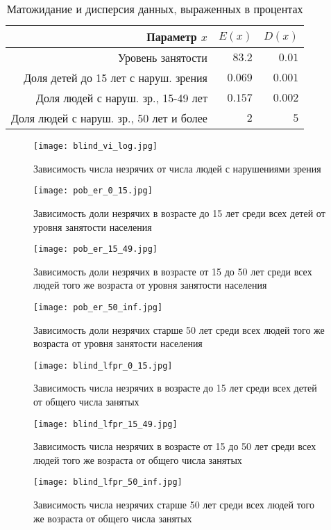 \documentclass[main.tex]{subfiles}
\begin{document}
	
\begin{table}[H]
	\centering
	\caption{Матожидание и дисперсия данных, выраженных в процентах}
	\begin{tabular}{*3r}
		\toprule
		Параметр $x$ & $E(x)$ & $D(x)$\\
		\midrule
		Уровень занятости & $83.2$ & $0.01$ \\
		Доля детей до 15 лет с наруш. зрения& $0.069$ & $0.001$ \\
		Доля людей с наруш. зр., 15-49 лет& $0.157$ & $0.002$ \\
		Доля людей с наруш. зр., 50 лет и более& $2$ & $5$ \\
		\bottomrule
	\end{tabular}
	\label{table}
\end{table}

\begin{figure}[H]
	\centering \texttt{[image: blind\_vi\_log.jpg]}
	\caption{Зависимость числа незрячих от числа людей с нарушениями зрения}
	\label{img:blind_vi}
\end{figure}

\begin{figure}[H]
	\centering \texttt{[image: pob\_er\_0\_15.jpg]}
	\caption{Зависимость доли незрячих в возрасте до 15 лет среди всех детей от уровня занятости населения}
	\label{img:pob_er_0_15}
\end{figure}
\begin{figure}[H]
	\centering \texttt{[image: pob\_er\_15\_49.jpg]}
	\caption{Зависимость доли незрячих в возрасте от 15 до 50 лет  среди всех людей того же возраста от уровня занятости населения}
	\label{img:pob_er_15_49}
\end{figure}
\begin{figure}[H]
	\centering \texttt{[image: pob\_er\_50\_inf.jpg]}
	\caption{Зависимость доли незрячих старше 50 лет  среди всех людей того же возраста от уровня занятости населения}
	\label{img:pob_er_50_inf}
\end{figure}

\begin{figure}[H]
	\centering \texttt{[image: blind\_lfpr\_0\_15.jpg]}
	\caption{Зависимость числа незрячих в возрасте до 15 лет среди всех детей от общего числа занятых}
	\label{img:blind_lfpr_0_15}
\end{figure}
\begin{figure}[H]
	\centering \texttt{[image: blind\_lfpr\_15\_49.jpg]}
	\caption{Зависимость числа незрячих в возрасте от 15 до 50 лет  среди всех людей того же возраста от общего числа занятых}
	\label{img:blind_lfpr_15_49}
\end{figure}
\begin{figure}[H]
	\centering \texttt{[image: blind\_lfpr\_50\_inf.jpg]}
	\caption{Зависимость числа незрячих старше 50 лет  среди всех людей того же возраста от общего числа занятых}
	\label{img:blind_lfpr_50_inf}
\end{figure}

	
\end{document}
